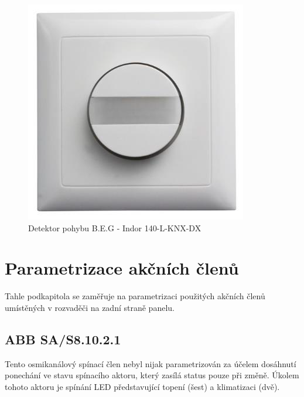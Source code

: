 \begin{figure}[!ht]
  \begin{center}
    \includegraphics[scale=0.45]{obrazky/BEG.png}
  \end{center}
  \caption[Detektor pohybu B.E.G - Indor 140-L-KNX-DX \cite{Mitrenga}]{Detektor pohybu B.E.G - Indor 140-L-KNX-DX  \cite{Mitrenga}}
  \label{fig:Detektor pohybu B.E.G - Indor 140-L-KNX-DX }
\end{figure}

\section{Parametrizace akčních členů}
Tahle podkapitola se zaměřuje na parametrizaci použitých akčních členů umístěných v rozvaděči na zadní straně panelu.
\subsection{ABB SA/S8.10.2.1}
Tento osmikanálový spínací člen nebyl nijak parametrizován za účelem dosáhnutí ponechání ve stavu spínacího aktoru, který zasílá status pouze při změně. Úkolem tohoto aktoru je spínání LED představující topení (šest) a klimatizaci (dvě).

